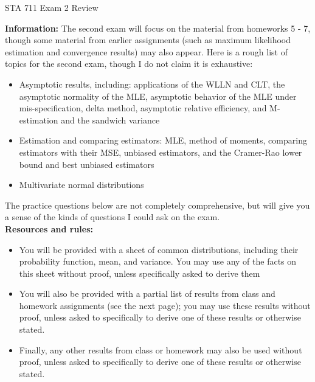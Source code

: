 \documentclass[11pt]{article}
\begin{document}
\begin{center}
\Large
STA 711 Exam 2 Review\\
\normalsize
\vspace{5mm}
\end{center} 

\noindent \textbf{Information:} The second exam will focus on the material from homeworks 5 - 7, though some material from earlier assignments (such as maximum likelihood estimation and convergence results) may also appear. Here is a rough list of topics for the second exam, though I do not claim it is exhaustive:

\begin{itemize}
\item Asymptotic results, including: applications of the WLLN and CLT, the asymptotic normality of the MLE, asymptotic behavior of the MLE under mis-specification, delta method, asymptotic relative efficiency, and M-estimation and the sandwich variance
\item Estimation and comparing estimators: MLE, method of moments, comparing estimators with their MSE, unbiased estimators, and the Cramer-Rao lower bound and best unbiased estimators
\item Multivariate normal distributions
\end{itemize}

\noindent The practice questions below are not completely comprehensive, but will give you a sense of the kinds of questions I could ask on the exam.\\

\noindent \textbf{Resources and rules:} 

\begin{itemize}
\item You will be provided with a sheet of common distributions, including their probability function, mean, and variance. You may use any of the facts on this sheet without proof, unless specifically asked to derive them

\item You will also be provided with a partial list of results from class and homework assignments (see the next page); you may use these results without proof, unless asked to specifically to derive one of these results or otherwise stated.

\item Finally, any other results from class or homework may also be used without proof, unless asked to specifically to derive one of these results or otherwise stated.
\end{itemize}
\end{document}
